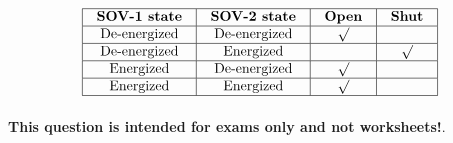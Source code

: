 






$$\vbox{\offinterlineskip
\halign{\strut
\vrule \quad\hfil # \ \hfil & 
\vrule \quad\hfil # \ \hfil & 
\vrule \quad\hfil # \ \hfil & 
\vrule \quad\hfil # \ \hfil \vrule \cr
\noalign{\hrule}
%
{\bf SOV-1 state} & {\bf SOV-2 state} & {\bf Open} & {\bf Shut} \cr
%
\noalign{\hrule}
%
De-energized & De-energized & $\surd$ &  \cr
%
\noalign{\hrule}
%
De-energized & Energized &  & $\surd$ \cr
%
\noalign{\hrule}
%
Energized & De-energized & $\surd$ &  \cr
%
\noalign{\hrule}
%
Energized & Energized & $\surd$ &  \cr
%
\noalign{\hrule}
} %
}$$ %







{\bf This question is intended for exams only and not worksheets!}.


